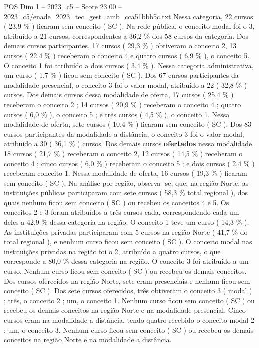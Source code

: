 \begin{textsample}{POS Dim 1 – 2023\_c5 – Score 23.00 – 2023\_c5/enade\_2023\_tec\_gest\_amb\_cca51bbb5c.txt}
Nessa categoria, 22 cursos ( 23,9 \% ) ficaram sem conceito ( SC ).
Na rede pública, o conceito modal foi o 3, atribuído a 21 cursos, correspondentes a 36,2 \% dos 58 cursos da categoria.
Dos demais cursos participantes, 17 cursos ( 29,3 \% ) obtiveram o conceito 2, 13 cursos ( 22,4 \% ) receberam o conceito 4 e quatro cursos ( 6,9 \% ), o conceito 5.
O conceito 1 foi atribuído a dois cursos ( 3,4 \% ).
Nessa categoria administrativa, um curso ( 1,7 \% ) ficou sem conceito ( SC ).
Dos 67 cursos participantes da modalidade presencial, o conceito 3 foi o valor modal, atribuído a 22 ( 32,8 \% ) cursos.
Dos demais cursos dessa modalidade de oferta, 17 cursos ( 25,4 \% ) receberam o conceito 2 ; 14 cursos ( 20,9 \% ) receberam o conceito 4 ; quatro cursos ( 6,0 \% ), o conceito 5 ; e três cursos ( 4,5 \% ), o conceito 1.
Nessa modalidade de oferta, sete cursos ( 10,4 \% ) ficaram sem conceito ( SC ).
Dos 83 cursos participantes da modalidade a distância, o conceito 3 foi o valor modal, atribuído a 30 ( 36,1 \% ) cursos.
Dos demais cursos \textbf{ofertados} nessa modalidade, 18 cursos ( 21,7 \% ) receberam o conceito 2, 12 cursos ( 14,5 \% ) receberam o conceito 4 ; cinco cursos ( 6,0 \% ) receberam o conceito 5 ; e dois cursos ( 2,4 \% ) receberam conceito 1.
Nessa modalidade de oferta, 16 cursos ( 19,3 \% ) ficaram sem conceito ( SC ).
Na análise por região, observa -se, que, na região Norte, as instituições públicas participaram com sete cursos ( 58,3 \% total regional ), dos quais nenhum ficou sem conceito ( SC ) ou recebeu os conceitos 4 e 5.
Os conceitos 2 e 3 foram atribuídos a três cursos cada, correspondendo cada um deles a 42,9 \% dessa categoria na região.
O conceito 1 teve um curso ( 14,3 \% ).
As instituições privadas participaram com 5 cursos na região Norte ( 41,7 \% do total regional ), e nenhum curso ficou sem conceito ( SC ).
O conceito modal nas instituições privadas na região foi o 2, atribuído a quatro cursos, o que corresponde a 80,0 \% dessa categoria na região.
O conceito 3 foi atribuído a um curso.
Nenhum curso ficou sem conceito ( SC ) ou recebeu os demais conceitos.
Dos cursos oferecidos na região Norte, sete eram presenciais e nenhum ficou sem conceito ( SC ).
Dos sete cursos oferecidos, três obtiveram o conceito 3 ( modal ) ; três, o conceito 2 ; um, o conceito 1.
Nenhum curso ficou sem conceito ( SC ) ou recebeu os demais conceitos na região Norte e na modalidade presencial.
Cinco cursos eram na modalidade a distância, tendo quatro recebido o conceito modal 2 ; um, o conceito 3.
Nenhum curso ficou sem conceito ( SC ) ou recebeu os demais conceitos na região Norte e na modalidade a distância.

\end{textsample}
